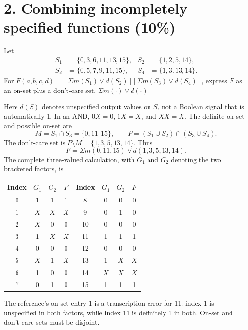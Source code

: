 \section{2. Combining incompletely specified functions (10\%)}
\begin{question}
Let
\begin{align*}
S_1&=\{0,3,6,11,13,15\},& S_2&=\{1,2,5,14\},\\
S_3&=\{0,5,7,9,11,15\},& S_4&=\{1,3,13,14\}.
\end{align*}
For $F(a,b,c,d)=[\Sigma m(S_1)\vee d(S_2)]
[\Sigma m(S_3)\vee d(S_4)]$, express $F$ as an on-set plus a don't-care set, $\Sigma m(\cdot)\vee d(\cdot)$.
\end{question}
\begin{solution}
Here $d(S)$ denotes unspecified output values on $S$, not a Boolean signal that is automatically 1. In an AND, $0X=0$, $1X=X$, and $XX=X$. The definite on-set and possible on-set are
\[
M=S_1\cap S_3=\{0,11,15\},\qquad
P=(S_1\cup S_2)\cap(S_3\cup S_4).
\]
The don't-care set is $P\setminus M=\{1,3,5,13,14\}$. Thus
\[
\boxed{F=\Sigma m(0,11,15)\vee d(1,3,5,13,14).}
\]
The complete three-valued calculation, with $G_1$ and $G_2$ denoting the two bracketed factors, is
\begin{center}
\begin{tabular}{c c c c@{\qquad}c c c c}
\toprule
Index &$G_1$&$G_2$&$F$&Index &$G_1$&$G_2$&$F$\\
\midrule
0&1&1&1&8&0&0&0\\
1&$X$&$X$&$X$&9&0&1&0\\
2&$X$&0&0&10&0&0&0\\
3&1&$X$&$X$&11&1&1&1\\
4&0&0&0&12&0&0&0\\
5&$X$&1&$X$&13&1&$X$&$X$\\
6&1&0&0&14&$X$&$X$&$X$\\
7&0&1&0&15&1&1&1\\
\bottomrule
\end{tabular}
\end{center}
The reference's on-set entry 1 is a transcription error for 11: index 1 is unspecified in both factors, while index 11 is definitely 1 in both. On-set and don't-care sets must be disjoint.
\end{solution}

